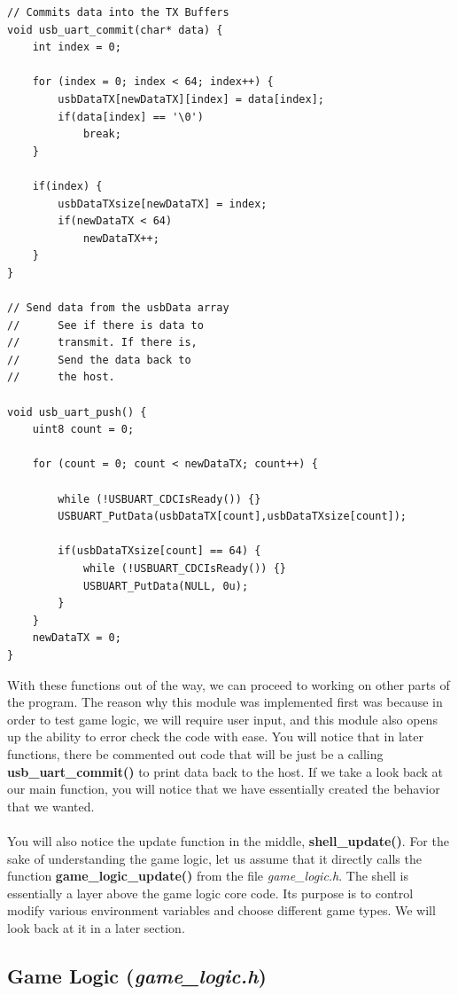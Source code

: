 \documentclass[a4paper, 12pt]{article}
\begin{document}
\begin{verbatim}
// Commits data into the TX Buffers
void usb_uart_commit(char* data) {
    int index = 0;
    
    for (index = 0; index < 64; index++) {
        usbDataTX[newDataTX][index] = data[index];
        if(data[index] == '\0')
            break;
    }
    
    if(index) {
        usbDataTXsize[newDataTX] = index;
        if(newDataTX < 64)
            newDataTX++;
    }
}

// Send data from the usbData array
//      See if there is data to
//      transmit. If there is,
//      Send the data back to
//      the host.

void usb_uart_push() {
    uint8 count = 0;
    
    for (count = 0; count < newDataTX; count++) {
        
        while (!USBUART_CDCIsReady()) {}
        USBUART_PutData(usbDataTX[count],usbDataTXsize[count]);
        
        if(usbDataTXsize[count] == 64) {
            while (!USBUART_CDCIsReady()) {}
            USBUART_PutData(NULL, 0u);
        } 
    }
    newDataTX = 0;
}
\end{verbatim}

    With these functions out of the way, we can proceed to working on other
    parts of the program. The reason why this module was implemented first
    was because in order to test game logic, we will require user input, and
    this module also opens up the ability to error check the code with ease.
    You will notice that in later functions, there be commented out code
    that will be just be a calling \textbf{usb\_uart\_commit()} to print
    data back to the host. If we take a look back at our main function, you
    will notice that we have essentially created the behavior that we
    wanted. 
    \\ \\
    You will also notice the update function in the middle,
    \textbf{shell\_update()}. For the sake of understanding the game logic, let
    us assume that it directly calls the function \textbf{game\_logic\_update()} from the
    file \textit{game\_logic.h}. The shell is essentially a layer above the
    game logic core code. Its purpose is to control modify various
    environment variables and choose different game types. We will look back
    at it in a later section.

    \subsection{Game Logic (\textit{game\_logic.h})}
\end{document}
